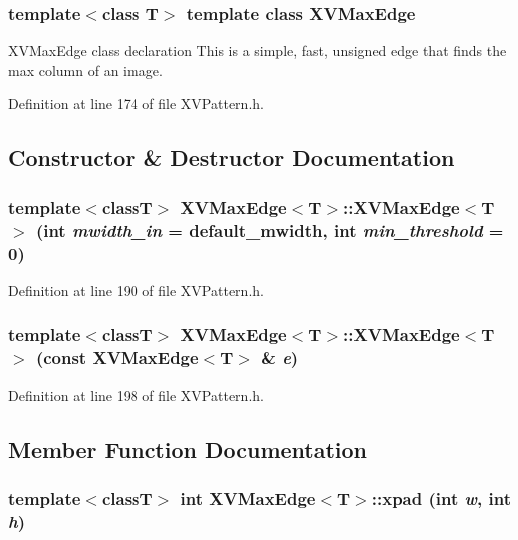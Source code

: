 \subsubsection*{template$<$class T$>$  template class XVMax\-Edge}

XVMax\-Edge class declaration This is a simple, fast, unsigned edge that finds the max column of an image.





Definition at line 174 of file XVPattern.h.

\subsection{Constructor \& Destructor Documentation}
\label{XVMaxEdge_a0}
\hypertarget{class_XVMaxEdge_a0}{
\subsubsection[XVMaxEdge]{\setlength{\rightskip}{0pt plus 5cm}template$<$classT$>$ XVMax\-Edge$<$T$>$::XVMax\-Edge$<$T$>$ (int {\em mwidth\_\-in} = default\_\-mwidth, int {\em min\_\-threshold} = 0)}}




Definition at line 190 of file XVPattern.h.\label{XVMaxEdge_a1}
\hypertarget{class_XVMaxEdge_a1}{
\subsubsection[XVMaxEdge]{\setlength{\rightskip}{0pt plus 5cm}template$<$classT$>$ XVMax\-Edge$<$T$>$::XVMax\-Edge$<$T$>$ (const XVMax\-Edge$<$T$>$ \& {\em e})}}




Definition at line 198 of file XVPattern.h.

\subsection{Member Function Documentation}
\label{XVMaxEdge_a2}
\hypertarget{class_XVMaxEdge_a2}{
\subsubsection[xpad]{\setlength{\rightskip}{0pt plus 5cm}template$<$classT$>$ int XVMax\-Edge$<$T$>$::xpad (int {\em w}, int {\em h})}}




